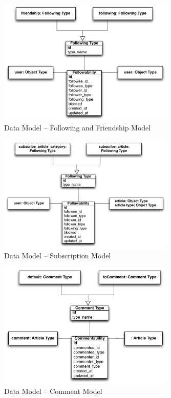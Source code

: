 \documentclass[12pt]{article}
\begin{document}
\begin{figure}[H]
\centering
\includegraphics[width=0.75\textwidth]{img/datamodel/user2user.pdf}
\caption{Data Model -- Following and Friendship Model}
\label{pic:data:user2user}
\end{figure}

\begin{figure}[H]
\centering
\includegraphics[width=0.75\textwidth]{img/datamodel/user2article.pdf}
\caption{Data Model -- Subscription Model}
\label{pic:data:user2article}
\end{figure}

\begin{figure}[H]
\centering
\includegraphics[width=0.75\textwidth]{img/datamodel/comment2article.pdf}
\caption{Data Model -- Comment Model}
\label{pic:data:comment2article}
\end{figure}
\end{document}
